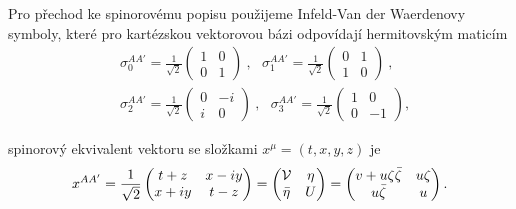Pro přechod ke spinorovému popisu použijeme Infeld-Van der Waerdenovy symboly, které pro kartézskou
vektorovou bázi odpovídají hermitovským maticím
\begin{equation}
    \label{eq:infeld-van-der-waerden}
    \begin{split}
        &\sigma_0^{AA'}=\frac{1}{\sqrt{2}}\left(\begin{matrix}
            1 & 0 \\
            0 & 1
        \end{matrix}\right)~,~~~ \sigma_1^{AA'}=\frac{1}{\sqrt{2}}\left(\begin{matrix}
            0 & 1 \\
            1 & 0
        \end{matrix}\right)~,\\
        &\sigma_2^{AA'}=\frac{1}{\sqrt{2}}\left(\begin{matrix}
            0 & -i \\
            i & 0
        \end{matrix}\right)~,~~~ \sigma_3^{AA'}=\frac{1}{\sqrt{2}}\left(\begin{matrix}
            1 & 0 \\
            0 & -1
        \end{matrix}\right),
    \end{split}
\end{equation}

spinorový ekvivalent vektoru se složkami $x^\mu = (t, x, y, z)$ je
\begin{equation}
    \label{eq:spinor_vektor}
    x^{AA'} = \frac{1}{\sqrt{2}} \begin{pmatrix}
        t + z & x - iy \\
        x + iy & t - z
    \end{pmatrix} = \begin{pmatrix}
        \mathcal{V} & \eta \\
        \bar{\eta} & U
    \end{pmatrix} = \begin{pmatrix}
        v + u \zeta \bar{\zeta} & u \zeta \\
        u \bar{\zeta} & u
    \end{pmatrix}.
\end{equation}

